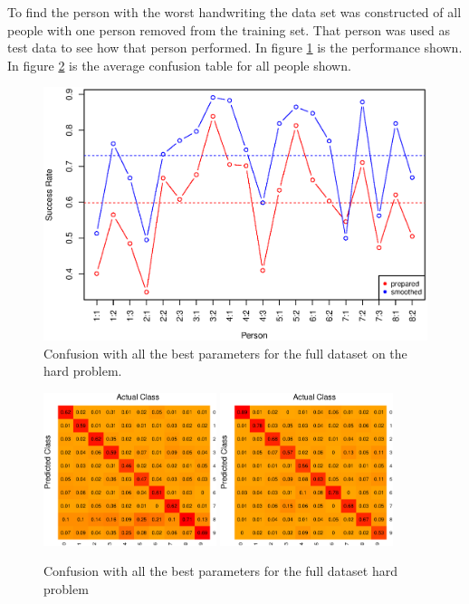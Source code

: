 To find the person with the worst handwriting the data set was constructed of all people with one person removed from the training set.
That person was used as test data to see how that person performed.
In figure \ref{fig:tree_performance_all} is the performance shown.
In figure \ref{fig:tree_confus_all} is the average confusion table for all people shown.

\begin{figure}[H]
\centering
\includegraphics[width=\textwidth]{graphics/tree_performance_all_combined}
\caption{Confusion with all the best parameters for the full dataset on the hard problem.}
\label{fig:tree_performance_all}
\end{figure}

\begin{figure}[H]
\centering
\includegraphics[width=0.45\textwidth]{graphics/tree_confusion_all}
\includegraphics[width=0.45\textwidth]{graphics/tree_confusion_all2}
\caption{Confusion with all the best parameters for the full dataset hard problem}
\label{fig:tree_confus_all}
\end{figure}

